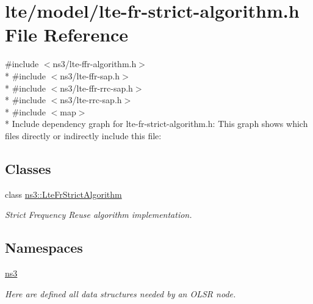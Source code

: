 \hypertarget{lte-fr-strict-algorithm_8h}{}\section{lte/model/lte-\/fr-\/strict-\/algorithm.h File Reference}
\label{lte-fr-strict-algorithm_8h}
{\ttfamily \#include $<$ns3/lte-\/ffr-\/algorithm.\+h$>$}\\*
{\ttfamily \#include $<$ns3/lte-\/ffr-\/sap.\+h$>$}\\*
{\ttfamily \#include $<$ns3/lte-\/ffr-\/rrc-\/sap.\+h$>$}\\*
{\ttfamily \#include $<$ns3/lte-\/rrc-\/sap.\+h$>$}\\*
{\ttfamily \#include $<$map$>$}\\*
Include dependency graph for lte-\/fr-\/strict-\/algorithm.h\+:
This graph shows which files directly or indirectly include this file\+:
\subsection*{Classes}
\begin{DoxyCompactItemize}
\item 
class \hyperlink{classns3_1_1LteFrStrictAlgorithm}{ns3\+::\+Lte\+Fr\+Strict\+Algorithm}
\begin{DoxyCompactList}\small\item\em Strict Frequency Reuse algorithm implementation. \end{DoxyCompactList}\end{DoxyCompactItemize}
\subsection*{Namespaces}
\begin{DoxyCompactItemize}
\item 
 \hyperlink{namespacens3}{ns3}
\begin{DoxyCompactList}\small\item\em Here are defined all data structures needed by an O\+L\+SR node. \end{DoxyCompactList}\end{DoxyCompactItemize}
